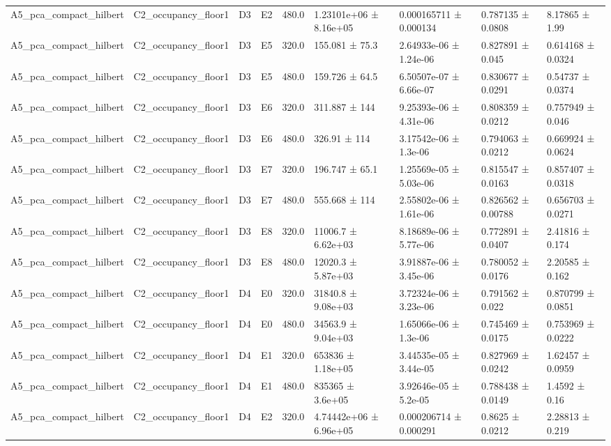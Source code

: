 \begin{table}
\begin{tabular}{lllllllll}
A5\_pca\_compact\_hilbert & C2\_occupancy\_floor1 & D3 & E2 & 480.0 & 1.23101e+06 ± 8.16e+05 & 0.000165711 ± 0.000134 & 0.787135 ± 0.0808 & 8.17865 ± 1.99 \\
A5\_pca\_compact\_hilbert & C2\_occupancy\_floor1 & D3 & E5 & 320.0 & 155.081 ± 75.3 & 2.64933e-06 ± 1.24e-06 & 0.827891 ± 0.045 & 0.614168 ± 0.0324 \\
A5\_pca\_compact\_hilbert & C2\_occupancy\_floor1 & D3 & E5 & 480.0 & 159.726 ± 64.5 & 6.50507e-07 ± 6.66e-07 & 0.830677 ± 0.0291 & 0.54737 ± 0.0374 \\
A5\_pca\_compact\_hilbert & C2\_occupancy\_floor1 & D3 & E6 & 320.0 & 311.887 ± 144 & 9.25393e-06 ± 4.31e-06 & 0.808359 ± 0.0212 & 0.757949 ± 0.046 \\
A5\_pca\_compact\_hilbert & C2\_occupancy\_floor1 & D3 & E6 & 480.0 & 326.91 ± 114 & 3.17542e-06 ± 1.3e-06 & 0.794063 ± 0.0212 & 0.669924 ± 0.0624 \\
A5\_pca\_compact\_hilbert & C2\_occupancy\_floor1 & D3 & E7 & 320.0 & 196.747 ± 65.1 & 1.25569e-05 ± 5.03e-06 & 0.815547 ± 0.0163 & 0.857407 ± 0.0318 \\
A5\_pca\_compact\_hilbert & C2\_occupancy\_floor1 & D3 & E7 & 480.0 & 555.668 ± 114 & 2.55802e-06 ± 1.61e-06 & 0.826562 ± 0.00788 & 0.656703 ± 0.0271 \\
A5\_pca\_compact\_hilbert & C2\_occupancy\_floor1 & D3 & E8 & 320.0 & 11006.7 ± 6.62e+03 & 8.18689e-06 ± 5.77e-06 & 0.772891 ± 0.0407 & 2.41816 ± 0.174 \\
A5\_pca\_compact\_hilbert & C2\_occupancy\_floor1 & D3 & E8 & 480.0 & 12020.3 ± 5.87e+03 & 3.91887e-06 ± 3.45e-06 & 0.780052 ± 0.0176 & 2.20585 ± 0.162 \\
A5\_pca\_compact\_hilbert & C2\_occupancy\_floor1 & D4 & E0 & 320.0 & 31840.8 ± 9.08e+03 & 3.72324e-06 ± 3.23e-06 & 0.791562 ± 0.022 & 0.870799 ± 0.0851 \\
A5\_pca\_compact\_hilbert & C2\_occupancy\_floor1 & D4 & E0 & 480.0 & 34563.9 ± 9.04e+03 & 1.65066e-06 ± 1.3e-06 & 0.745469 ± 0.0175 & 0.753969 ± 0.0222 \\
A5\_pca\_compact\_hilbert & C2\_occupancy\_floor1 & D4 & E1 & 320.0 & 653836 ± 1.18e+05 & 3.44535e-05 ± 3.44e-05 & 0.827969 ± 0.0242 & 1.62457 ± 0.0959 \\
A5\_pca\_compact\_hilbert & C2\_occupancy\_floor1 & D4 & E1 & 480.0 & 835365 ± 3.6e+05 & 3.92646e-05 ± 5.2e-05 & 0.788438 ± 0.0149 & 1.4592 ± 0.16 \\
A5\_pca\_compact\_hilbert & C2\_occupancy\_floor1 & D4 & E2 & 320.0 & 4.74442e+06 ± 6.96e+05 & 0.000206714 ± 0.000291 & 0.8625 ± 0.0212 & 2.28813 ± 0.219 \\

\end{tabular}
\end{table}
